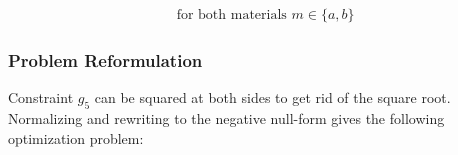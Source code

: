 	\begin{table}[H]
\end{table}
\vspace{-8mm}
\begin{align*}
	& \text{for both materials } m \in \{a, b\} \nonumber 
\end{align*}
	

\subsubsection{Problem Reformulation}
Constraint $g_5$ can be squared at both sides to get rid of the square root. Normalizing and rewriting to the negative null-form gives the following optimization problem:


